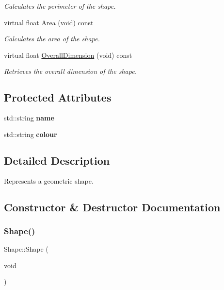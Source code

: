\begin{DoxyCompactItemize}
\begin{DoxyCompactList}\small\item\em Calculates the perimeter of the shape. \end{DoxyCompactList}\item 
virtual float \mbox{\hyperlink{class_shape_ad0c742cb695fdb3e575a31bcd4784c26}{Area}} (void) const
\begin{DoxyCompactList}\small\item\em Calculates the area of the shape. \end{DoxyCompactList}\item 
virtual float \mbox{\hyperlink{class_shape_a60aea90f45ea0f6d60cd749918728e16}{Overall\+Dimension}} (void) const
\begin{DoxyCompactList}\small\item\em Retrieves the overall dimension of the shape. \end{DoxyCompactList}\end{DoxyCompactItemize}
\subsection*{Protected Attributes}
\begin{DoxyCompactItemize}
\item 
\mbox{\label{class_shape_afcf3b83c2ab303d26b2d2c2ea616d495}} 
std\+::string {\bfseries name}
\item 
\mbox{\label{class_shape_a7a879731b934ef89f1d08048d63754ca}} 
std\+::string {\bfseries colour}
\end{DoxyCompactItemize}


\subsection{Detailed Description}
Represents a geometric shape. 

\subsection{Constructor \& Destructor Documentation}
\mbox{\label{class_shape_aaa8d87171e65e0d8ba3c5459978992a7}} 
\subsubsection{\texorpdfstring{Shape()}{Shape()}\hspace{0.1cm}{\footnotesize\ttfamily [1/2]}}
{\footnotesize\ttfamily Shape\+::\+Shape (\begin{DoxyParamCaption}\item[{void}]{ }\end{DoxyParamCaption})}



